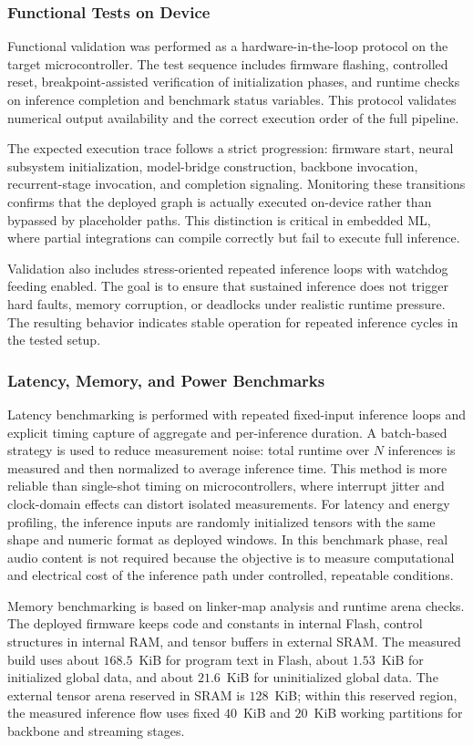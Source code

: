 \documentclass[a4paper,singleside,12pt]{report} %
\begin{document}
\subsubsection{Functional Tests on Device}
	Functional validation was performed as a hardware-in-the-loop protocol on the target microcontroller. The test sequence includes firmware flashing, controlled reset, breakpoint-assisted verification of initialization phases, and runtime checks on inference completion and benchmark status variables. This protocol validates numerical output availability and the correct execution order of the full pipeline.

	The expected execution trace follows a strict progression: firmware start, neural subsystem initialization, model-bridge construction, backbone invocation, recurrent-stage invocation, and completion signaling. Monitoring these transitions confirms that the deployed graph is actually executed on-device rather than bypassed by placeholder paths. This distinction is critical in embedded ML, where partial integrations can compile correctly but fail to execute full inference.

	Validation also includes stress-oriented repeated inference loops with watchdog feeding enabled. The goal is to ensure that sustained inference does not trigger hard faults, memory corruption, or deadlocks under realistic runtime pressure. The resulting behavior indicates stable operation for repeated inference cycles in the tested setup.
\subsubsection{Latency, Memory, and Power Benchmarks}
\label{sec:device_benchmarks}
	Latency benchmarking is performed with repeated fixed-input inference loops and explicit timing capture of aggregate and per-inference duration. A batch-based strategy is used to reduce measurement noise: total runtime over \(N\) inferences is measured and then normalized to average inference time. This method is more reliable than single-shot timing on microcontrollers, where interrupt jitter and clock-domain effects can distort isolated measurements.
	For latency and energy profiling, the inference inputs are randomly initialized tensors with the same shape and numeric format as deployed windows. In this benchmark phase, real audio content is not required because the objective is to measure computational and electrical cost of the inference path under controlled, repeatable conditions.

	Memory benchmarking is based on linker-map analysis and runtime arena checks. The deployed firmware keeps code and constants in internal Flash, control structures in internal RAM, and tensor buffers in external SRAM. The measured build uses about \(168.5\)~KiB for program text in Flash, about \(1.53\)~KiB for initialized global data, and about \(21.6\)~KiB for uninitialized global data. The external tensor arena reserved in SRAM is \(128\)~KiB; within this reserved region, the measured inference flow uses fixed \(40\)~KiB and \(20\)~KiB working partitions for backbone and streaming stages.
\end{document}
